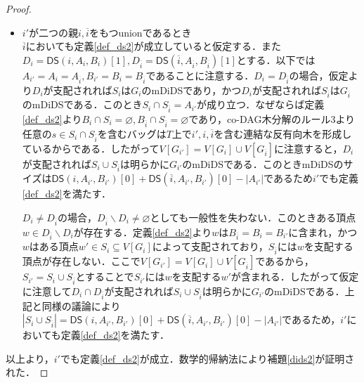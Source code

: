 \documentclass[master]{kuisthesis}		%
\def\|{\verb|}
\theoremstyle{plain}
\theoremstyle{definition}
\begin{document}
{\begin{proof}
\begin{itemize}
        \item $i'$が二つの親$i, \overline{i}$をもつunionであるとき \\
        $\overline{i}$においても定義\ref{def_ds2}が成立していると仮定する．また$D_i = \mathsf{DS}(i, A_i, B_i)[1], D_{\overline{i}} = \mathsf{DS}(\overline{i}, A_{\overline{i}}, B_{\overline{i}})[1]$とする．以下では$A_{i'} = A_{i} = A_{\overline{i}}, B_{i'} = B_{i} = B_{\overline{i}}$であることに注意する．$D_i = D_{\overline{i}}$の場合，仮定より$D_i$が支配されれば$S_i$は$G_i$のmDiDSであり，かつ$D_i$が支配されれば$S_{\overline{i}}$は$G_{\overline{i}}$のmDiDSである．このとき$S_{i} \cap S_{\overline{i}} = A_{i'}$が成り立つ．なぜならば定義\ref{def_ds2}より$B_{i} \cap S_i = \varnothing, B_{\overline{i}} \cap S_{\overline{i}} = \varnothing$であり，co-DAG木分解のルール3より任意の$s \in S_{i} \cap S_{\overline{i}}$を含むバッグは$T$上で$i', i, \overline{i}$を含む連結な反有向木を形成しているからである．したがって$V[G_{i'}] = V[G_i] \cup V[G_{\overline{i}}]$に注意すると，$D_i$が支配されれば$S_i \cup S_{\overline{i}}$は明らかに$G_{i'}$のmDiDSである．このときmDiDSのサイズは$\mathsf{DS}(i, A_{i'}, B_{i'})[0] + \mathsf{DS}(\overline{i}, A_{i'}, B_{i'})[0] - |A_{i'}|$であるため$i'$でも定義\ref{def_ds2}を満たす．

        $D_i \neq D_{\overline{i}}$の場合，$D_{\overline{i}} \backslash D_i \neq \varnothing$としても一般性を失わない．このときある頂点$w \in D_{\overline{i}} \backslash D_i$が存在する．定義\ref{def_ds2}より$w$は$B_{\overline{i}} = B_{i} = B_{i'}$に含まれ，かつ$w$はある頂点$w' \in S_i\subseteq V[G_i]$によって支配されており，$S_{\overline{i}}$には$w$を支配する頂点が存在しない．ここで$V[G_{i'}] = V[G_i] \cup V[G_{\overline{i}}]$であるから，$S_{i'} = S_i \cup S_{\overline{i}}$とすることで$S_{i'}$には$w$を支配する$w'$が含まれる．したがって仮定に注意して$D_i \cap D_{\overline{i}}$が支配されれば$S_i \cup S_{\overline{i}}$は明らかに$G_{i'}$のmDiDSである．上記と同様の議論により$|S_i \cup S_{\overline{i}}| = \mathsf{DS}(i, A_{i'}, B_{i'})[0] + \mathsf{DS}(\overline{i}, A_{i'}, B_{i'})[0] - |A_{i'}|$であるため，$i'$においても定義\ref{def_ds2}を満たす．
        
    \end{itemize}
    以上より，$i'$でも定義\ref{def_ds2}が成立．数学的帰納法により補題\ref{dids2}が証明された．
\end{proof}

}





\end{document}

